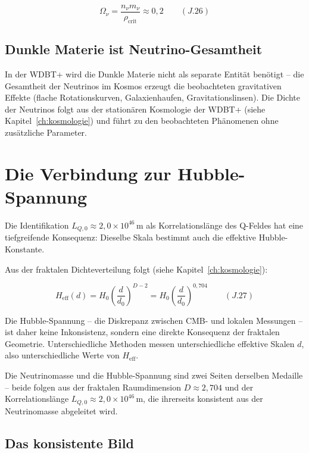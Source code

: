 \[
\Omega_{\nu} = \frac{n_{\nu} m_{\nu}}{\rho_{\text{crit}}} \approx 0,2 \qquad (J.26)
\]

\subsection{Dunkle Materie ist Neutrino-Gesamtheit}
\label{sub:neutrino_oszillation_identitaet_dm}

In der WDBT+ wird die Dunkle Materie nicht als separate Entität benötigt – die Gesamtheit der Neutrinos im Kosmos erzeugt die beobachteten gravitativen Effekte (flache Rotationskurven, Galaxienhaufen, Gravitationslinsen). Die Dichte der Neutrinos folgt aus der stationären Kosmologie der WDBT+ (siehe Kapitel~\ref{ch:kosmologie}) und führt zu den beobachteten Phänomenen ohne zusätzliche Parameter.

\section{Die Verbindung zur Hubble-Spannung}
\label{app:neutrino_oszillation_hubble}

Die Identifikation \( L_{Q,0} \approx 2{,}0 \times 10^{46} \, \text{m} \) als Korrelationslänge des Q-Feldes hat eine tiefgreifende Konsequenz: Dieselbe Skala bestimmt auch die effektive Hubble-Konstante.

Aus der fraktalen Dichteverteilung folgt (siehe Kapitel~\ref{ch:kosmologie}):

\[
H_{\text{eff}}(d) = H_0 \left( \frac{d}{d_0} \right)^{D-2} = H_0 \left( \frac{d}{d_0} \right)^{0,704} \qquad (J.27)
\]

Die Hubble-Spannung – die Diskrepanz zwischen CMB- und lokalen Messungen – ist daher keine Inkonsistenz, sondern eine direkte Konsequenz der fraktalen Geometrie. Unterschiedliche Methoden messen unterschiedliche effektive Skalen \( d \), also unterschiedliche Werte von \( H_{\text{eff}} \).

Die Neutrinomasse und die Hubble-Spannung sind zwei Seiten derselben Medaille – beide folgen aus der fraktalen Raumdimension \( D \approx 2,704 \) und der Korrelationslänge \( L_{Q,0} \approx 2{,}0 \times 10^{46} \, \text{m} \), die ihrerseits konsistent aus der Neutrinomasse abgeleitet wird.

\subsection{Das konsistente Bild}
\label{sub:neutrino_oszillation_konsistenz}


